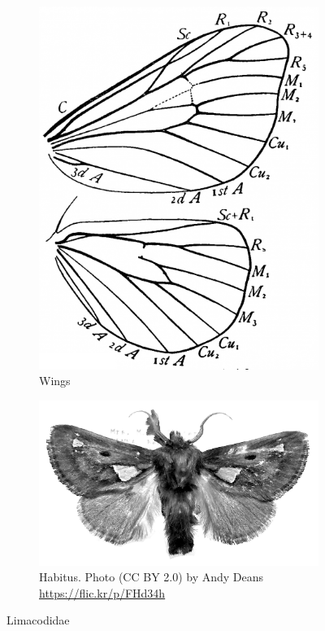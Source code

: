 \documentclass[letterpaper, 11pt]{article}
\begin{document}
\begin{figure}[ht!]
    \centering
    \begin{subfigure}[ht!]{0.3\textwidth}
        \includegraphics[width=\textwidth]{LimacodidWings}
        \caption{Wings \citep[Fig. 349]{comstock1918wings}}
        \label{fig:limacodid1}
    \end{subfigure}
    \hfill %
    \begin{subfigure}[ht!]{0.55\textwidth}
        \includegraphics[width=\textwidth]{limacodid.png}
        \caption{Habitus. Photo (CC BY 2.0) by Andy Deans \url{https://flic.kr/p/FHd34h}}
        \label{fig:limacodid2}
    \end{subfigure}
    \caption{Limacodidae}\label{fig:limacodids}
\end{figure}
\end{document}
